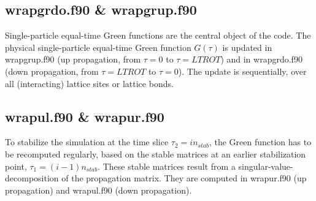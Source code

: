 \subsection{wrapgrdo.f90 \& wrapgrup.f90}
Single-particle equal-time Green functions are the central object of the code. The physical single-particle equal-time Green function $G(\tau)$ is updated in wrapgrup.f90 (up propagation, from $\tau=0$ to $\tau=LTROT$) 
and in wrapgrdo.f90 (down propagation, from $\tau=LTROT$ to $\tau=0$). The update is sequentially, over all (interacting) lattice sites or lattice bonds.
\subsection{wrapul.f90 \& wrapur.f90}
To stabilize the simulation at the time slice $\tau_{2}=i n_{stab}$, the Green function has to be recomputed regularly, based on the stable matrices at an earlier stabilization point, $\tau_{1}=(i-1) n_{stab}$.
These stable matrices result from a singular-value-decomposition of the propagation matrix. They are computed in wrapur.f90 (up propagation) and wrapul.f90  (down propagation).